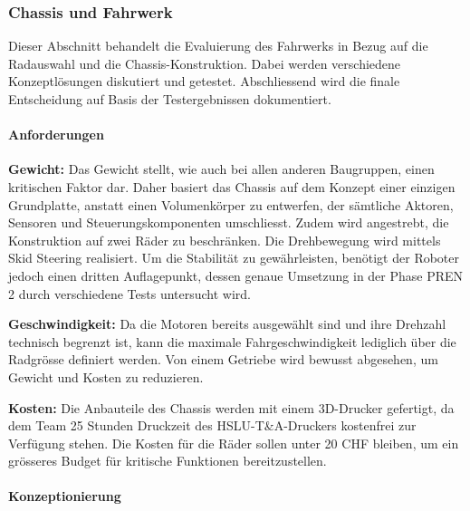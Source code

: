 \documentclass[main.tex]{subfiles} %
\begin{document}

\subsubsection{Chassis und Fahrwerk}

Dieser Abschnitt behandelt die Evaluierung des Fahrwerks in Bezug auf die Radauswahl
und die Chassis-Konstruktion. Dabei werden verschiedene Konzeptlösungen diskutiert und
getestet. Abschliessend wird die finale Entscheidung auf Basis der Testergebnissen 
dokumentiert.

\paragraph{Anforderungen}

\textbf{Gewicht:} \newline
Das Gewicht stellt, wie auch bei allen anderen Baugruppen, einen kritischen Faktor dar. 
Daher basiert das Chassis auf dem Konzept einer einzigen Grundplatte, anstatt einen 
Volumenkörper zu entwerfen, der sämtliche Aktoren, Sensoren und Steuerungskomponenten 
umschliesst. Zudem wird angestrebt, die Konstruktion auf zwei Räder zu beschränken. 
Die Drehbewegung wird mittels Skid Steering realisiert. Um die Stabilität zu 
gewährleisten, benötigt der Roboter jedoch einen dritten Auflagepunkt, dessen genaue 
Umsetzung in der Phase PREN 2 durch verschiedene Tests untersucht wird.

\textbf{Geschwindigkeit:} \newline
Da die Motoren bereits ausgewählt sind und ihre Drehzahl technisch begrenzt ist, 
kann die maximale Fahrgeschwindigkeit lediglich über die Radgrösse definiert werden. 
Von einem Getriebe wird bewusst abgesehen, um Gewicht und Kosten zu reduzieren.

\textbf{Kosten:} \newline
Die Anbauteile des Chassis werden mit einem 3D-Drucker gefertigt, da dem Team 
25 Stunden Druckzeit des HSLU-T\&A-Druckers kostenfrei zur Verfügung stehen. 
Die Kosten für die Räder sollen unter 20 CHF bleiben, um ein grösseres Budget 
für kritische Funktionen bereitzustellen.

\paragraph{Konzeptionierung}
\end{document}
